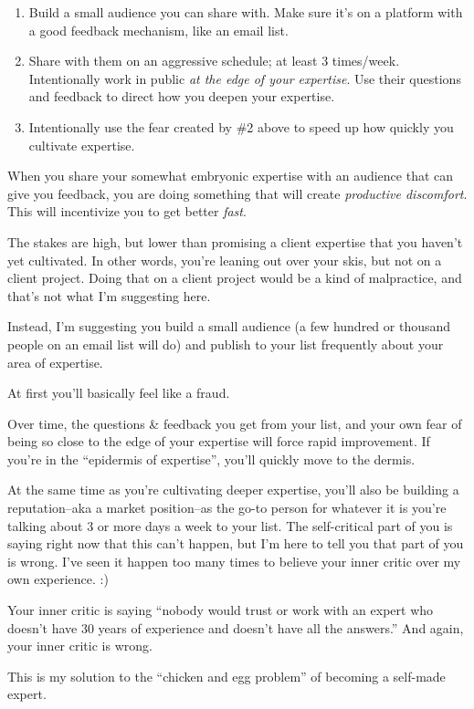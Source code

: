 \begin{enumerate}
\item Build a small audience you can share with. Make sure it's on a platform with a good feedback mechanism, like an email list.
\item Share with them on an aggressive schedule; at least 3 times/week. Intentionally work in public \emph{at the edge of your expertise}. Use their questions and feedback to direct how you deepen your expertise.
\item Intentionally use the fear created by \#2 above to speed up how quickly you cultivate expertise.
\end{enumerate}

When you share your somewhat embryonic expertise with an audience that can give you feedback, you are doing something that will create \emph{productive discomfort}. This will incentivize you to get better \emph{fast}.

The stakes are high, but lower than promising a client expertise that you haven't yet cultivated. In other words, you're leaning out over your skis, but not on a client project. Doing that on a client project would be a kind of malpractice, and that's not what I'm suggesting here.

Instead, I'm suggesting you build a small audience (a few hundred or thousand people on an email list will do) and publish to your list frequently about your area of expertise.

At first you'll basically feel like a fraud.

Over time, the questions \& feedback you get from your list, and your own fear of being so close to the edge of your expertise will force rapid improvement. If you're in the ``epidermis of expertise'', you'll quickly move to the dermis.

At the same time as you're cultivating deeper expertise, you'll also be building a reputation--aka a market position--as the go-to person for whatever it is you're talking about 3 or more days a week to your list. The self-critical part of you is saying right now that this can't happen, but I'm here to tell you that part of you is wrong. I've seen it happen too many times to believe your inner critic over my own experience. :)

Your inner critic is saying ``nobody would trust or work with an expert who doesn't have 30 years of experience and doesn't have all the answers.'' And again, your inner critic is wrong.

This is my solution to the ``chicken and egg problem'' of becoming a self-made expert.

